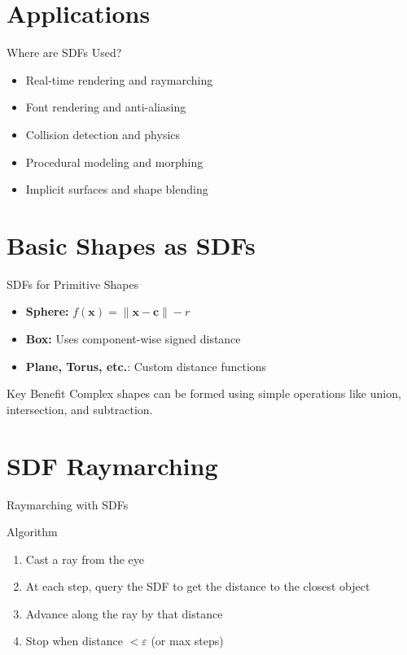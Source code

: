 \section{Applications}
\begin{frame}{Where are SDFs Used?}
  \begin{itemize}
    \item Real-time rendering and raymarching
    \item Font rendering and anti-aliasing
    \item Collision detection and physics
    \item Procedural modeling and morphing
    \item Implicit surfaces and shape blending
  \end{itemize}
\end{frame}

\section{Basic Shapes as SDFs}
\begin{frame}{SDFs for Primitive Shapes}
  \begin{itemize}
    \item \textbf{Sphere:} $f(\mathbf{x}) = \|\mathbf{x} - \mathbf{c}\| - r$
    \item \textbf{Box:} Uses component-wise signed distance
    \item \textbf{Plane, Torus, etc.}: Custom distance functions
  \end{itemize}
  \begin{conceptbox}{Key Benefit}
    Complex shapes can be formed using simple operations like union, intersection, and subtraction.
  \end{conceptbox}
\end{frame}

\section{SDF Raymarching}
\begin{frame}{Raymarching with SDFs}
  \begin{conceptbox}{Algorithm}
    \begin{enumerate}
      \item<1-> Cast a ray from the eye
      \item<2-> At each step, query the SDF to get the distance to the closest object
      \item<3-> Advance along the ray by that distance
      \item<4-> Stop when distance $< \varepsilon$ (or max steps)
    \end{enumerate}
  \end{conceptbox}
\end{frame}

